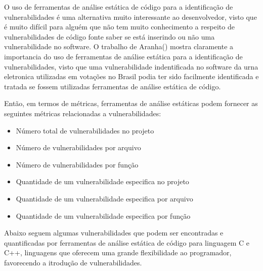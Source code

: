 O uso de ferramentas de análise estática de código para a identificação de vulnerabilidades é uma alternativa muito interessante ao desenvolvedor, visto que é muito difícil para alguém que não tem muito conhecimento a respeito de vulnerabilidades de código fonte saber se está inserindo ou não uma vulnerabilidade no software. O trabalho de Aranha(\citeyear{aranha2012}) mostra claramente a importancia do uso de ferramentas de análise estática para a identificação de vulnerabilidades, visto que uma vulnerabilidade indentificada no software da urna eletronica utilizadas em votações no Brasil podia ter sido facilmente identificada e tratada se fossem utilizadas ferramentas de análise estática de código.

%

Então, em termos de métricas, ferramentas de análise estáticas podem fornecer as seguintes métricas relacionadas a vulnerabilidades:

\begin{itemize}
\item Número total de vulnerabilidades no projeto
\item Número de vulnerabilidades por arquivo
\item Número de vulnerabilidades por função
\item Quantidade de um vulnerabilidade especifica no projeto
\item Quantidade de um vulnerabilidade especifica por arquivo
\item Quantidade de um vulnerabilidade especifica por função
\end{itemize}

%
Abaixo seguem algumas vulnerabilidades que podem ser encontradas e quantificadas	 por ferramentas de análise estática de código para linguagem C e C++, linguagens que oferecem uma grande flexibilidade ao programador, favorecendo a itrodução de vulnerabilidades.

